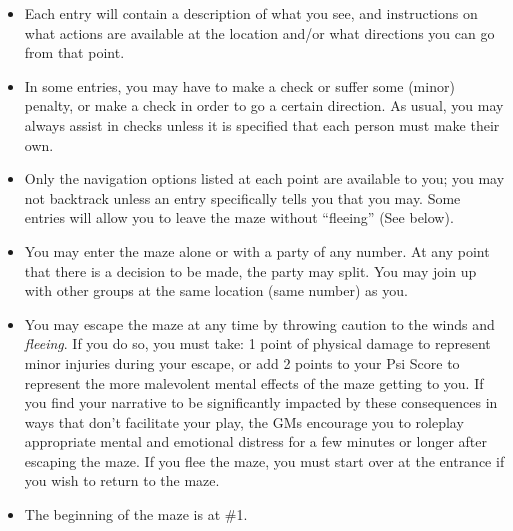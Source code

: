 \documentclass[green]{gl2018}
\begin{document}
\begin{itemize}
\item Each entry will contain a description of what you see, and instructions on what actions are available at the location and/or what directions you can go from that point.  
\item In some entries, you may have to make a check or suffer some (minor) penalty, or make a check in order to go a certain direction. As usual, you may always assist in checks unless it is specified that each person must make their own. 
\item Only the navigation options listed at each point are available to you; you may not backtrack unless an entry specifically tells you that you may. Some entries will allow you to leave the maze without “fleeing” (See below).
\item You may enter the maze alone or with a party of any number. At any point that there is a decision to be made, the party may split. You may join up with other groups at the same location (same number) as you. 
\item You may escape the maze at any time by throwing caution to the winds and {\em fleeing}. If you do so, you must take: 1 point of physical damage to represent minor injuries during your escape, or add 2 points to your Psi Score to represent the more malevolent mental effects of the maze getting to you. If you find your narrative to be significantly impacted by these consequences in ways that don't facilitate your play, the GMs encourage you to roleplay appropriate mental and emotional distress for a few minutes or longer after escaping the maze. If you flee the maze, you must start over at the entrance if you wish to return to the maze. 
\item The beginning of the maze is at \#1.
\end{itemize}
\pagebreak
\end{document}
